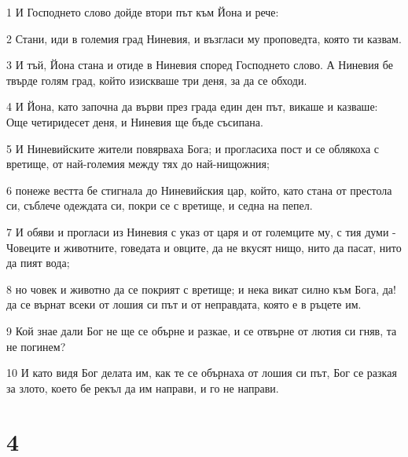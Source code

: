 \par 1 И Господнето слово дойде втори път към Йона и рече:
\par 2 Стани, иди в големия град Ниневия, и възгласи му проповедта, която ти казвам.
\par 3 И тъй, Йона стана и отиде в Ниневия според Господнето слово. А Ниневия бе твърде голям град, който изискваше три деня, за да се обходи.
\par 4 И Йона, като започна да върви през града един ден път, викаше и казваше: Още четиридесет деня, и Ниневия ще бъде съсипана.
\par 5 И Ниневийските жители повярваха Бога; и прогласиха пост и се облякоха с вретище, от най-големия между тях до най-нищожния;
\par 6 понеже вестта бе стигнала до Ниневийския цар, който, като стана от престола си, съблече одеждата си, покри се с вретище, и седна на пепел.
\par 7 И обяви и прогласи из Ниневия с указ от царя и от големците му, с тия думи - Човеците и животните, говедата и овците, да не вкусят нищо, нито да пасат, нито да пият вода;
\par 8 но човек и животно да се покрият с вретище; и нека викат силно към Бога, да! да се върнат всеки от лошия си път и от неправдата, която е в ръцете им.
\par 9 Кой знае дали Бог не ще се обърне и разкае, и се отвърне от лютия си гняв, та не погинем?
\par 10 И като видя Бог делата им, как те се обърнаха от лошия си път, Бог се разкая за злото, което бе рекъл да им направи, и го не направи.

\chapter{4}

